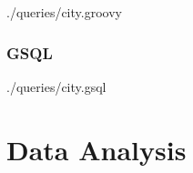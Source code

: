 
{./queries/city.groovy}

\subsubsection{GSQL}



{./queries/city.gsql}

\FloatBarrier
\section{Data Analysis}
\label{app:analysis}

